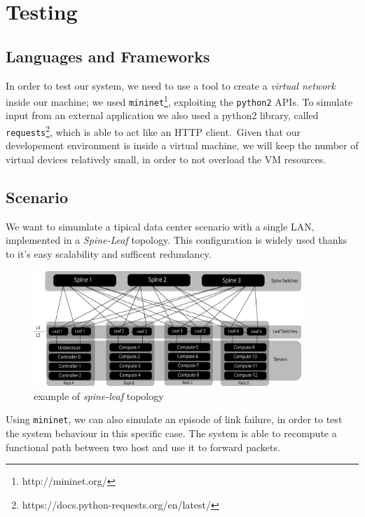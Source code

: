 \chapter{Testing}
\section*{Languages and Frameworks}
In order to test our system, we need to use a tool to create a \textit{virtual network} inside our machine; 
we used \texttt{mininet}\footnote{http://mininet.org/}, 
exploiting the \texttt{python2} APIs. To simulate input from an external application we also used a python2 library, called \texttt{requests}\footnote{https://docs.python-requests.org/en/latest/},
which is able to act like an HTTP client.\
Given that our developement environment is inside a virtual machine, we will keep the number of virtual devices relatively small, in order to not
overload the VM resources.

\section*{Scenario}
We want to simumlate a tipical data center scenario with a single LAN, implemented in a \textit{Spine-Leaf} topology. This configuration
is widely used thanks to it's easy scalability and sufficent redundancy.
\begin{figure}[h]
    \centering
    \caption{example of \textit{spine-leaf} topology}
    \includegraphics[width=0.90\textwidth]{img/spine_leaf.pdf}
\end{figure}

Using \texttt{mininet}, we can also simulate an episode of link failure, in order to test the system behaviour in this specific case. The system is able to
recompute a functional path between two host and use it to forward packets.
\newpage
